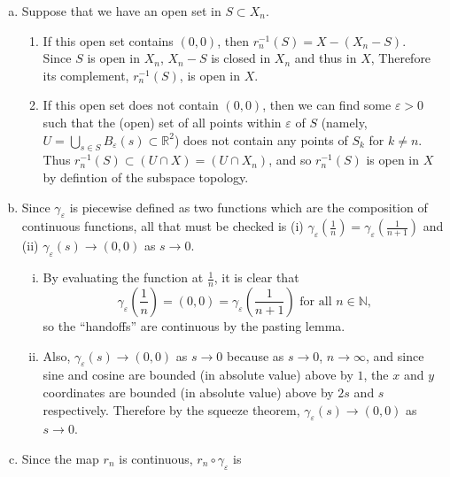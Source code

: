 \documentclass{article}
\newenvironment{solution}[1][Solution.]{\begin{trivlist}
\item[\hskip \labelsep {\bfseries #1}]}{\end{trivlist}}
\begin{document}
\begin{solution} \text{}
  \begin{enumerate}[a.]
    \item Suppose that we have an open set in $S \subset X_n$.
    \begin{enumerate}
      \item If this open set contains $(0, 0)$,
      then $r_n^{-1}(S) = X - (X_n - S)$. \\
      Since $S$ is open in $X_n$, $X_n - S$ is closed in $X_n$ and thus in $X$,
      Therefore its complement, $r_n^{-1}(S)$, is open in $X$.
      \item If this open set does not contain $(0, 0)$, then we can find some
      $\varepsilon > 0$ such that the (open) set of all points within $\varepsilon$ of
      $S$ (namely, $\displaystyle U = \bigcup_{s \in S} B_\varepsilon(s) \subset \mathbb R^2$) does
      not contain any points of $S_k$ for $k \neq n$.
      Thus $r_n^{-1}(S) \subset (U \cap X) = (U \cap X_n)$, and so $r_n^{-1}(S)$
      is open in $X$ by defintion of the subspace topology.
    \end{enumerate}
    \item Since $\gamma_\varepsilon$ is piecewise defined as two functions which
      are the composition of continuous functions, all that must be checked is
      (i) $\gamma_\varepsilon(\frac{1}{n}) = \gamma_\varepsilon(\frac{1}{n + 1})$ and
      (ii) $\gamma_\varepsilon(s) \rightarrow (0, 0)$ as $s \rightarrow 0$.
      \begin{enumerate}[(i)]
        \item By evaluating the function at $\frac{1}{n}$, it is clear that \[
          \gamma_\varepsilon\!\left(\frac{1}{n}\right)
          = (0, 0)
          = \gamma_\varepsilon\!\left(\frac{1}{n + 1}\right)
          \text{ for all } n \in \mathbb N,
        \] so the ``handoffs'' are continuous by the pasting lemma.
        \item Also, $\gamma_\varepsilon(s) \rightarrow (0, 0)$ as $s \rightarrow 0$
        because as $s \rightarrow 0$, $n \rightarrow \infty$, and since
        sine and cosine are bounded (in absolute value) above by $1$, the $x$ and $y$ coordinates
        are bounded (in absolute value) above by $2s$ and $s$ respectively. Therefore
        by the squeeze theorem, $\gamma_\varepsilon(s) \rightarrow (0, 0)$ as
        $s \rightarrow 0$.
      \end{enumerate}
    \item Since the map $r_n$ is continuous, $r_n \circ \gamma_\varepsilon$ is

\end{enumerate}
\end{solution}
\end{document}
